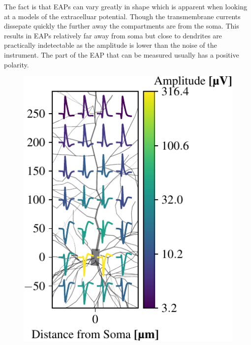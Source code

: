 \documentclass[altfont, fleqn]{uiophd}
\begin{document}
The fact is that EAPs can vary greatly in shape which is 
apparent when looking at a models of the extracelluar potential. 
Though the transmembrane currents dissepate quickly 
the further away the compartments are from the soma.
This results in EAPs relatively far away from soma but close
to dendrites are practically indetectable as the amplitude 
is lower than the noise of the instrument. 
The part of the EAP that can be measured usually has a positive 
polarity.
\begin{figure}
    \vspace{-20pt}
    \begin{center}
        \includegraphics[width=\linewidth]{images/sec_2/grid_y_x_signals_2d_normalized.pdf}
        \vspace{-20pt}
        \caption{%
        }
        \label{fig:2_eap_grid}
        \vspace{-10pt}
    \end{center}
\end{figure}
\end{document}
